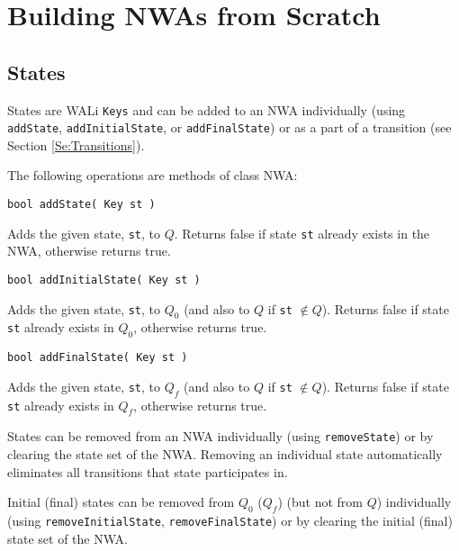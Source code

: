 \section{Building NWAs from Scratch}
\label{Se:Scratch}

\subsection{States}
\label{Se:States}

States are WALi \texttt{Keys} and can be added to an NWA
individually (using \texttt{addState}, \texttt{addInitialState}, or
\texttt{addFinalState}) or as a part of a transition (see Section
\ref{Se:Transitions}).  

\noindent The following operations are methods of class NWA:

\begin{description}

  \item\texttt{bool addState( Key st )} \nopagebreak

    Adds the given state, \texttt{st}, to $Q$.  Returns false if state
    \texttt{st} already exists in the NWA, otherwise returns true.

  \item\texttt{bool addInitialState( Key st )} \nopagebreak

    Adds the given state, \texttt{st}, to $Q_0 $ (and also to $Q$ if
    \texttt{st} $\not\in Q$).  Returns false if state \texttt{st} already
    exists in $Q_0$, otherwise returns true.

  \item\texttt{bool addFinalState( Key st )} \nopagebreak

    Adds the given state, \texttt{st}, to $Q_f$ (and also to $Q$ if
    \texttt{st} $\not\in Q$).  Returns false if state \texttt{st} already
    exists in $Q_f$, otherwise returns true.

\end{description}


States can be removed from an NWA individually (using \texttt{removeState})
or by clearing the state set of the NWA. 
Removing an individual state automatically eliminates all transitions that
state participates in.

Initial (final) states can be removed from $Q_0 $ ($Q_f$) (but not from $Q$)
individually (using \texttt{removeInitialState}, \texttt{removeFinalState})
or by clearing the initial (final) state set of the NWA.

